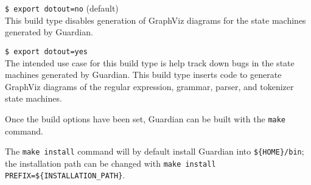{\begin{itemize}
{		\item {\texttt{\$ export dotout=no} (default)}\\
		{
			This build type disables generation of GraphViz diagrams for the
			state machines generated by Guardian.
		}
		
		\item {\texttt{\$ export dotout=yes}}\\
		{
			The intended use case for this build type is help track down bugs
			in the state machines generated by Guardian. This build type
			inserts code to generate GraphViz diagrams of the
			regular expression,
			grammar, parser, and tokenizer state machines.
		}
	}
	\end{itemize}
	
	Once the build options have been set, Guardian can be built with the
	\texttt{make} command.
	
	The \texttt{make install} command will by default install Guardian into
	\texttt{\$\{HOME\}/bin}; the installation path can be changed with
	\texttt{make install PREFIX=\$\{INSTALLATION\_PATH\}}.
}

















